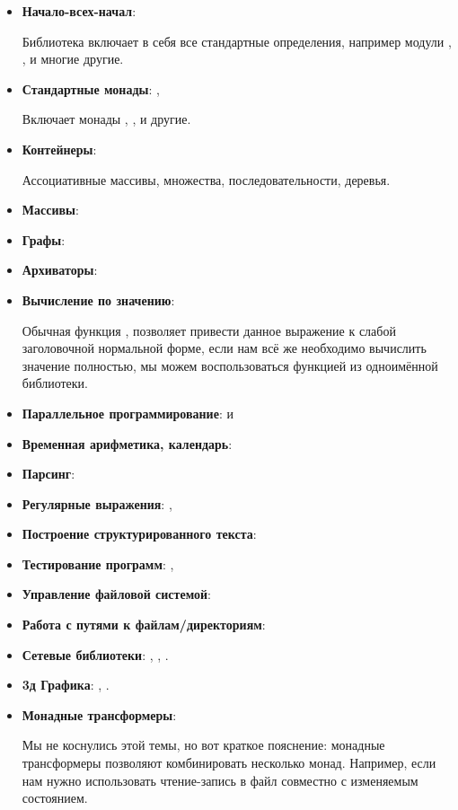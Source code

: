 \begin{itemize}
\item
  \textbf{Начало-всех-начал}: 

  Библиотека включает в себя все стандартные определения, например
  модули , ,  и многие
  другие.
\item
  \textbf{Стандартные монады}: , 

  Включает монады , ,  и другие.
\item
  \textbf{Контейнеры}: 

  Ассоциативные массивы, множества, последовательности, деревья.
\item
  \textbf{Массивы}: 
\item
  \textbf{Графы}: 
\item
  \textbf{Архиваторы}: 
\item
  \textbf{Вычисление по значению}: 

  Обычная функция , позволяет привести данное выражение к слабой
  заголовочной нормальной форме, если нам всё же необходимо вычислить
  значение полностью, мы можем воспользоваться функцией  из
  одноимённой библиотеки.
\item
  \textbf{Параллельное программирование}:  и 
\item
  \textbf{Временная арифметика, календарь}: 
\item
  \textbf{Парсинг}: 
\item
  \textbf{Регулярные выражения}: , 
\item
  \textbf{Построение структурированного текста}: 
\item
  \textbf{Тестирование программ}: , 
\item
  \textbf{Управление файловой системой}: 
\item
  \textbf{Работа с путями к файлам/директориям}: 
\item
  \textbf{Сетевые библиотеки}: , , .
\item
  \textbf{3д Графика}: , .
\item
  \textbf{Монадные трансформеры}: 

  Мы не коснулись этой темы, но вот краткое пояснение: монадные
  трансформеры позволяют комбинировать несколько монад. Например, если
  нам нужно использовать чтение-запись в файл совместно с изменяемым
  состоянием.
\end{itemize}

